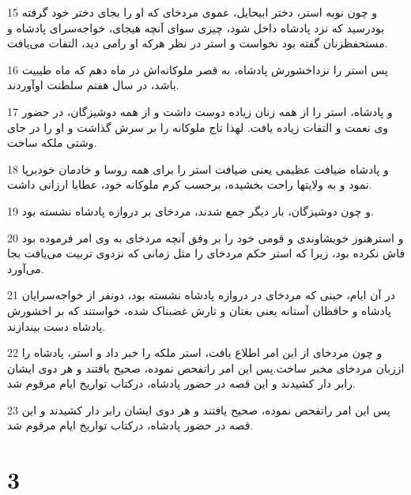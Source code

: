 \par 15 و چون نوبه استر، دختر ابیحایل، عموی مردخای که او را بجای دختر خود گرفته بودرسید که نزد پادشاه داخل شود، چیزی سوای آنچه هیجای، خواجه‌سرای پادشاه و مستحفظزنان گفته بود نخواست و استر در نظر هر‌که او رامی دید، التفات می‌یافت.
\par 16 پس استر را نزداخشورش پادشاه، به قصر ملوکانه‌اش در ماه دهم که ماه طیبیت باشد، در سال هفتم سلطنت اوآوردند.
\par 17 و پادشاه، استر را از همه زنان زیاده دوست داشت و از همه دوشیزگان، در حضور وی نعمت و التفات زیاده یافت. لهذا تاج ملوکانه را بر سرش گذاشت و او را در جای وشتی ملکه ساخت.
\par 18 و پادشاه ضیافت عظیمی یعنی ضیافت استر را برای همه روسا و خادمان خودبرپا نمود و به ولایتها راحت بخشیده، برحسب کرم ملوکانه خود، عطایا ارزانی داشت.
\par 19 و چون دوشیزگان، بار دیگر جمع شدند، مردخای بر دروازه پادشاه نشسته بود.
\par 20 و استرهنوز خویشاوندی و قومی خود را بر وفق آنچه مردخای به وی امر فرموده بود فاش نکرده بود، زیرا که استر حکم مردخای را مثل زمانی که نزدوی تربیت می‌یافت بجا می‌آورد.
\par 21 در آن ایام، حینی که مردخای در دروازه پادشاه نشسته بود، دونفر از خواجه‌سرایان پادشاه و حافظان آستانه یعنی بغتان و تارش غضبناک شده، خواستند که بر اخشورش پادشاه دست بیندازند.
\par 22 و چون مردخای از این امر اطلاع یافت، استر ملکه را خبر داد و استر، پادشاه را اززبان مردخای مخبر ساخت.پس این امر راتفحص نموده، صحیح یافتند و هر دوی ایشان رابر دار کشیدند و این قصه در حضور پادشاه، درکتاب تواریخ ایام مرقوم شد.
\par 23 پس این امر راتفحص نموده، صحیح یافتند و هر دوی ایشان رابر دار کشیدند و این قصه در حضور پادشاه، درکتاب تواریخ ایام مرقوم شد.
 
\chapter{3}


